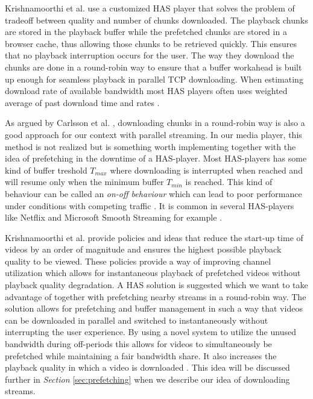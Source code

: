 Krishnamoorthi et al. \cite{qualbranch} use a customized HAS player that solves the problem of tradeoff between quality and number of chunks downloaded. The playback chunks are stored in the playback buffer while the prefetched chunks are stored in a browser cache, thus allowing those chunks to be retrieved quickly. This ensures that no playback interruption occurs for the user. The way they download the chunks are done in a round-robin way to ensure that a buffer workahead is built up enough for seamless playback in parallel TCP downloading. When estimating download rate of available bandwidth most HAS players often uses weighted average of past download time and rates \cite{qualbranch}. 

As argued by Carlsson et al. \cite{optimizedstreaming}, downloading chunks in a round-robin way is also a good approach for our context with parallel streaming. In our media player, this method is not realized but is something worth implementing together with the idea of prefetching in the downtime of a HAS-player. Most HAS-players has some kind of buffer treshold $T_{max}$ where downloading is interrupted when reached and will resume only when the minimum buffer $T_{min}$ is reached. This kind of behaviour can be called an \textit{on-off behaviour} which can lead to poor performance under conditions with competing traffic \cite{whathappens, bandawarePrefetch}. It is common in several HAS-players like Netflix and Microsoft Smooth Streaming for example \cite{bandawarePrefetch}. 

Krishnamoorthi et al. \cite{bandawarePrefetch} provide policies and ideas that reduce the start-up time of videos by an order of magnitude and ensures the highest possible playback quality to be viewed. These policies provide a way of improving channel utilization which allows for instantaneous playback of prefetched videos without playback quality degradation. A HAS solution is suggested which we want to take advantage of together with prefetching nearby streams in a round-robin way. The solution allows for prefetching and buffer management in such a way that videos can be downloaded in parallel and switched to instantaneously without interrupting the user experience. By using a novel system to utilize the unused bandwidth during off-periods this allows for videos to simultaneously be prefetched while maintaining a fair bandwidth share. It also increases the playback quality in which a video is downloaded \cite{bandawarePrefetch}. This idea will be discussed further in \textit{Section} \ref{sec:prefetching} when we describe our idea of downloading streams.

